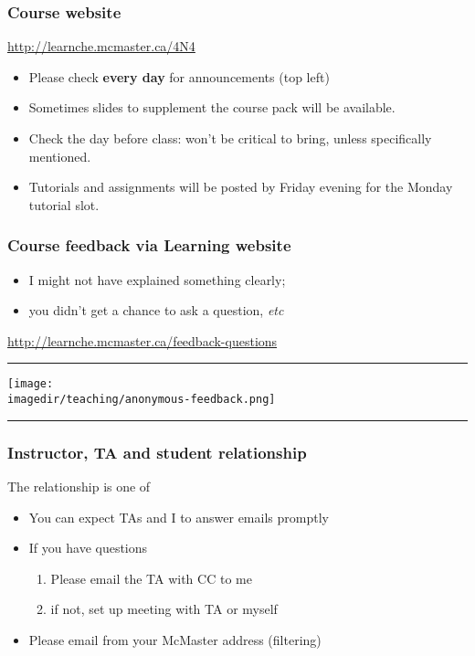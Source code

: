 \begin{frame}\frametitle{Course website}	
	\begin{exampleblock}{}
		\centering 
		\href{http://learnche.mcmaster.ca/4N4}{http://learnche.mcmaster.ca/4N4}
	\end{exampleblock}
	\begin{itemize}
		\item	Please check \textbf{every day} for announcements {\tiny (top left)}
		\item	Sometimes slides to supplement the course pack will be available. 
		\item	Check the day before class: won't be critical to bring, unless specifically mentioned.
		\item	Tutorials and assignments will be posted by Friday evening for the Monday tutorial slot.
	\end{itemize}
\end{frame}

\begin{frame}\frametitle{Course feedback via Learning website}
	\begin{itemize}
		\item	I might not have explained something clearly;  
		\item	you didn't get a chance to ask a question, \emph{etc}		
	\end{itemize}
	\href{http://learnche.mcmaster.ca/feedback-questions}{http://learnche.mcmaster.ca/feedback-questions}
	\vspace{12pt}
	\hrule
	\begin{center}
		\texttt{[image: \\imagedir/teaching/anonymous-feedback.png]}
	\end{center}
	\hrule
\end{frame}

\begin{frame}\frametitle{Instructor, TA and student relationship}
	\begin{exampleblock}{}
		The relationship is one of {}
	\end{exampleblock}
	
	\begin{itemize}
		\item	You can expect TAs and I to answer emails promptly
		\item	If you have questions
			\begin{enumerate}
				\item	Please email the TA with CC to me \hfill {\tiny{\color{myOrange}{$\longleftarrow$ hopefully this solves your problem}}}
				\item	if not, set up meeting with TA or myself
			\end{enumerate}
		\item	Please email from your McMaster address (filtering)
	\end{itemize}
\end{frame}

